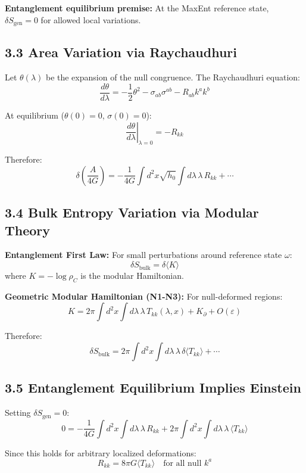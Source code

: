 \textbf{Entanglement equilibrium premise:} At the MaxEnt reference state, \(\delta S_{\text{gen}} = 0\) for allowed local variations.

\subsection{3.3 Area Variation via Raychaudhuri}\label{33-area-variation-via-raychaudhuri}

Let \(\theta(\lambda)\) be the expansion of the null congruence. The Raychaudhuri equation: \[\frac{d\theta}{d\lambda} = -\frac{1}{2}\theta^2 - \sigma_{ab}\sigma^{ab} - R_{ab}k^a k^b\]

At equilibrium (\(\theta(0) = 0\), \(\sigma(0) = 0\)): \[\left.\frac{d\theta}{d\lambda}\right|_{\lambda=0} = -R_{kk}\]

Therefore: \[\delta\left(\frac{A}{4G}\right) = -\frac{1}{4G}\int d^2x \sqrt{h_0} \int d\lambda \, \lambda \, R_{kk} + \cdots\]

\subsection{3.4 Bulk Entropy Variation via Modular Theory}\label{34-bulk-entropy-variation-via-modular-theory}

\textbf{Entanglement First Law:} For small perturbations around reference state \(\omega\): \[\delta S_{\text{bulk}} = \delta\langle K \rangle\] where \(K = -\log \rho_C\) is the modular Hamiltonian.

\textbf{Geometric Modular Hamiltonian (N1-N3):} For null-deformed regions: \[K = 2\pi \int d^2x \int d\lambda \, \lambda \, T_{kk}(\lambda, x) + K_\partial + O(\varepsilon)\]

Therefore: \[\delta S_{\text{bulk}} = 2\pi \int d^2x \int d\lambda \, \lambda \, \delta\langle T_{kk} \rangle + \cdots\]

\subsection{3.5 Entanglement Equilibrium Implies Einstein}\label{35-entanglement-equilibrium-implies-einstein}

Setting \(\delta S_{\text{gen}} = 0\): \[0 = -\frac{1}{4G}\int d^2x \int d\lambda \, \lambda \, R_{kk} + 2\pi \int d^2x \int d\lambda \, \lambda \, \langle T_{kk} \rangle\]

Since this holds for arbitrary localized deformations: \[R_{kk} = 8\pi G \langle T_{kk} \rangle \quad \text{for all null } k^a\]


